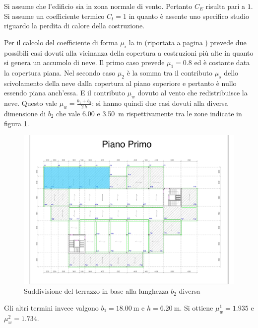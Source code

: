 Si assume che l'edificio sia in zona normale di vento. Pertanto $C_E$ risulta pari a $1$.
Si assume un coefficiente termico $C_t = 1$ in quanto è assente uno specifico studio riguardo la perdita di calore della costruzione. 

Per il calcolo del coefficiente di forma $\mu_i$ la  in  (riportata a pagina \pageref{fig:C345}) prevede due possibili casi dovuti alla vicinanza della copertura a costruzioni più alte in quanto si genera un accumolo di neve.
Il primo caso prevede $\mu_1=0.8$ ed è costante data la copertura piana. Nel secondo caso $\mu_2$ è la somma tra il contributo $\mu_s$ dello scivolamento della neve dalla copertura al piano superiore e pertanto è nullo essendo piana anch'essa. 
E il contributo $\mu_w$ dovuto al vento che redistribuisce la neve. 
Questo vale $\mu_w=\frac{b_1 + b_2}{2\,h}$: si hanno quindi due casi dovuti alla diversa dimensione di $b_2$ che vale \SI{6.00}{} e \SI{3.50}{\meter} rispettivamente tra le zone indicate in figura \ref{fig:traveZonaAB}.
\begin{figure}[htbp]
\centering
\includegraphics[trim=5.8cm 13cm 9.5cm 4.1cm,clip,frame,width=\textwidth]{IMG/Piante/Piante-AB.pdf} 
\caption{Suddivisione del terrazzo in base alla lunghezza $b_2$ diversa}
\label{fig:traveZonaAB}
\end{figure}
Gli altri termini invece valgono $b_1=\SI{18.00}{\meter}$ e $h=\SI{6.20}{\meter}$. 
Si ottiene $\mu_w^1=1.935$ e $\mu_w^2=1.734$.

